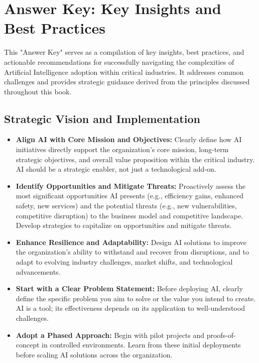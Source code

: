 \chapter{Answer Key: Key Insights and Best Practices}
\label{chap:answer_key}

This "Answer Key" serves as a compilation of key insights, best practices, and actionable recommendations for successfully navigating the complexities of Artificial Intelligence adoption within critical industries. It addresses common challenges and provides strategic guidance derived from the principles discussed throughout this book.

\section*{Strategic Vision and Implementation}
\begin{itemize}
    \item \textbf{Align AI with Core Mission and Objectives:} Clearly define how AI initiatives directly support the organization's core mission, long-term strategic objectives, and overall value proposition within the critical industry. AI should be a strategic enabler, not just a technological add-on.
    \item \textbf{Identify Opportunities and Mitigate Threats:} Proactively assess the most significant opportunities AI presents (e.g., efficiency gains, enhanced safety, new services) and the potential threats (e.g., new vulnerabilities, competitive disruption) to the business model and competitive landscape. Develop strategies to capitalize on opportunities and mitigate threats.
    \item \textbf{Enhance Resilience and Adaptability:} Design AI solutions to improve the organization's ability to withstand and recover from disruptions, and to adapt to evolving industry challenges, market shifts, and technological advancements.
    \item \textbf{Start with a Clear Problem Statement:} Before deploying AI, clearly define the specific problem you aim to solve or the value you intend to create. AI is a tool; its effectiveness depends on its application to well-understood challenges.
    \item \textbf{Adopt a Phased Approach:} Begin with pilot projects and proofs-of-concept in controlled environments. Learn from these initial deployments before scaling AI solutions across the organization.
\end{itemize}

